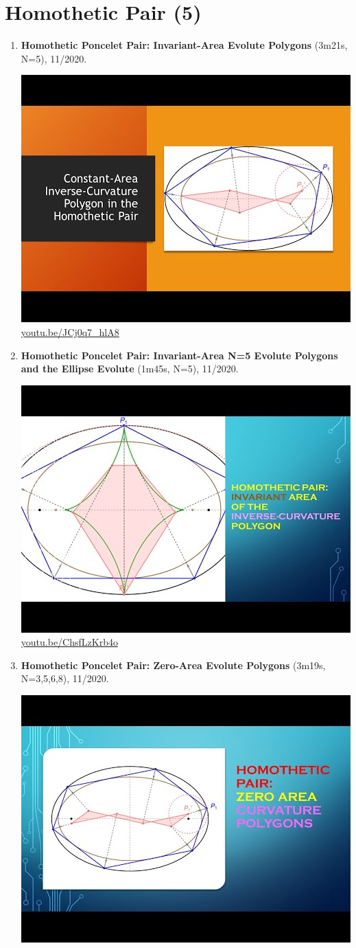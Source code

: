 \documentclass[12pt]{amsart}
\begin{document}
\section{Homothetic Pair (5)}

\begin{enumerate}[resume]
\item \textbf{Homothetic Poncelet Pair: Invariant-Area Evolute Polygons} (3m21s, N=5), 11/2020. 
\begin{center}\includegraphics[width=.5\textwidth]{pics/JCj0q7_hlA8.jpg} \\ 
\href{https://youtu.be/JCj0q7_hlA8}{\url{youtu.be/JCj0q7\_hlA8}}\end{center}
% 
\item \textbf{Homothetic Poncelet Pair: Invariant-Area N=5 Evolute Polygons and the Ellipse Evolute} (1m45s, N=5), 11/2020. 
\begin{center}\includegraphics[width=.5\textwidth]{pics/ChsfLzKrb4o.jpg} \\ 
\href{https://youtu.be/ChsfLzKrb4o}{\url{youtu.be/ChsfLzKrb4o}}\end{center}
% 
\item \textbf{Homothetic Poncelet Pair: Zero-Area Evolute Polygons} (3m19s, N=3,5,6,8), 11/2020. 
\begin{center}\includegraphics[width=.5\textwidth]{pics/3nvXYFoI5Wg.jpg} \\ 

\end{center}
\end{enumerate}
\end{document}
